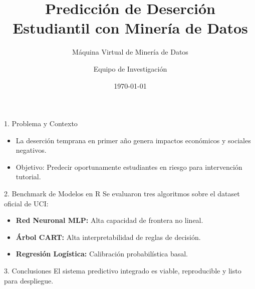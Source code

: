 \documentclass{beamer}
\title[Sustentación Proyecto]{Predicción de Deserción Estudiantil con Minería de Datos}
\subtitle{Máquina Virtual de Minería de Datos}
\author{Equipo de Investigación}
\date{\today}
\begin{document}
\begin{frame}
\titlepage
\end{frame}
\begin{frame}{1. Problema y Contexto}
\begin{itemize}
\item La deserción temprana en primer año genera impactos económicos y sociales negativos.
\item Objetivo: Predecir oportunamente estudiantes en riesgo para intervención tutorial.
\end{itemize}
\end{frame}
\begin{frame}{2. Benchmark de Modelos en R}
Se evaluaron tres algoritmos sobre el dataset oficial de UCI:
\begin{itemize}
\item \textbf{Red Neuronal MLP:} Alta capacidad de frontera no lineal.
\item \textbf{Árbol CART:} Alta interpretabilidad de reglas de decisión.
\item \textbf{Regresión Logística:} Calibración probabilística basal.
\end{itemize}
\end{frame}
\begin{frame}{3. Conclusiones}
El sistema predictivo integrado es viable, reproducible y listo para despliegue.
\end{frame}
\end{document}
